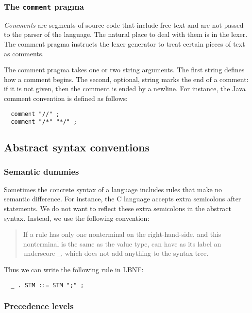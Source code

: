 \subsubsection{The {\tt comment} pragma}

\textit{Comments} are segments of source code that include free
text and are not passed to the parser of the language. The natural place
to deal with them is in the lexer. The comment pragma instructs the
lexer generator to treat certain pieces of text as comments. 

The comment pragma takes one or two string arguments. The first
string defines how a comment begins.
The second, optional, string marks the end of a comment:
if it is not given, then the comment is ended by a newline.
For instance, the Java comment convention is defined as follows:
\begin{verbatim}
  comment "//" ;
  comment "/*" "*/" ; 
\end{verbatim}





\subsection{Abstract syntax conventions}

\subsubsection{Semantic dummies}

Sometimes the concrete syntax of a language includes rules that make
no semantic difference. For instance, the C language 
accepts extra semicolons after statements.
We do not want to reflect these extra semicolons in the abstract syntax.
Instead, we use the following convention:
\begin{quote}
If a rule has only one nonterminal on the right-hand-side, and this
nonterminal is the same as the value type, can have as its label
an underscore {\tt \_}, which 
does not add anything to the syntax tree.
\end{quote}
Thus we can write the following rule in LBNF:
\begin{verbatim}
  _ . STM ::= STM ";" ;
\end{verbatim}



\subsubsection{Precedence levels}

